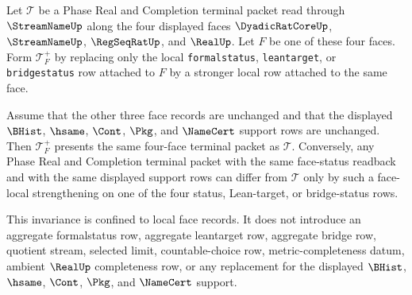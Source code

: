 \begin{theorem}
\label{thm:streamname-terminal-face-local-status-strengthening}
Let $\mathcal T$ be a Phase Real and Completion terminal packet read through $\StreamNameUp$ along the four displayed faces $\DyadicRatCoreUp$, $\StreamNameUp$, $\RegSeqRatUp$, and $\RealUp$. Let $F$ be one of these four faces. Form $\mathcal T_F^+$ by replacing only the local \texttt{formalstatus}, \texttt{leantarget}, or \texttt{bridgestatus} row attached to $F$ by a stronger local row attached to the same face.

Assume that the other three face records are unchanged and that the displayed $\BHist$, $\hsame$, $\Cont$, $\Pkg$, and $\NameCert$ support rows are unchanged. Then $\mathcal T_F^+$ presents the same four-face terminal packet as $\mathcal T$. Conversely, any Phase Real and Completion terminal packet with the same face-status readback and with the same displayed support rows can differ from $\mathcal T$ only by such a face-local strengthening on one of the four status, Lean-target, or bridge-status rows.

This invariance is confined to local face records. It does not introduce an aggregate formalstatus row, aggregate leantarget row, aggregate bridge row, quotient stream, selected limit, countable-choice row, metric-completeness datum, ambient $\RealUp$ completeness row, or any replacement for the displayed $\BHist$, $\hsame$, $\Cont$, $\Pkg$, and $\NameCert$ support.
\end{theorem}
